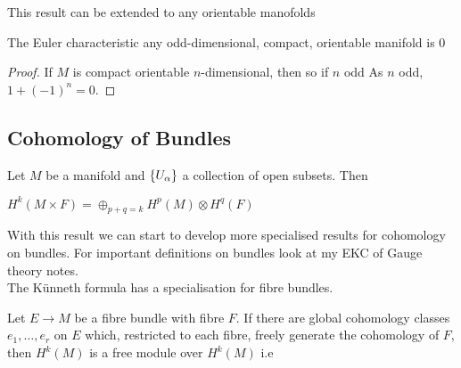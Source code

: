 \documentclass{article}
\begin{document}
\begin{remark}
	This result can be extended to any orientable manofolds 
\end{remark}

\begin{corollary}
The Euler characteristic any odd-dimensional, compact, orientable manifold is 0
\end{corollary}
\begin{proof}
If $M$ is compact orientable $n$-dimensional, then 
so if $n$ odd
As $n$ odd, $1+(-1)^n=0$.
\end{proof}

\subsection{Cohomology of Bundles}

\begin{prop}
	Let $M$ be a manifold and $\left\{ U_\alpha \right\}$ a collection of open subsets. Then 
\end{prop}

\begin{prop}
	$H^k(M \times F) = \oplus_{p+q=k} H^p(M) \otimes H^q(F)$
\end{prop}

With this result we can start to develop more specialised results for cohomology on bundles. For important definitions on bundles look at my EKC of Gauge theory notes. \\
The K\"unneth formula has a specialisation for fibre bundles. 

\begin{theorem}
Let $E\to M$ be a fibre bundle with fibre $F$. If there are global cohomology classes $e_1, \dots, e_r$ on $E$ which, restricted to each fibre, freely generate the cohomology of $F$, then $H^k(M)$ is a free module over $H^k(M)$ i.e 
\end{theorem}
\end{document}
